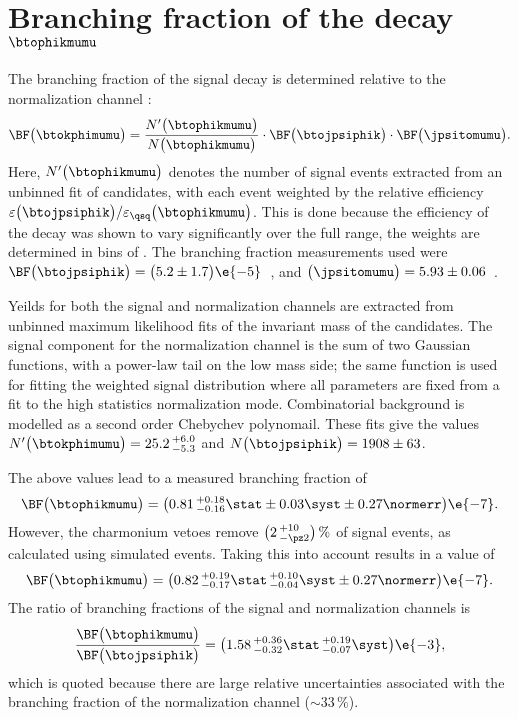 \section[Branching fraction of the decay \btophikmumu]
{Branching fraction of the decay $\boldsymbol{\btophikmumu}$}

The branching fraction of the signal decay \btophikmumu is determined relative to the normalization
channel \btojpsiphik:
\begin{equation}
  \BF\big(\btokphimumu\big)=
  \frac{ N^\prime\big(\btophikmumu\big) }{ N\big(\btophikmumu\big) }
  \cdot\BF\big(\btojpsiphik\big)
  \cdot\BF\big(\jpsitomumu\big).
\end{equation}
Here, $N^\prime\big(\btophikmumu\big)$ denotes the number of signal events extracted from an
unbinned fit of \btophikmumu candidates, with each event weighted by the relative efficiency
$\varepsilon\big(\btojpsiphik\big) / \varepsilon_{\qsq}\big(\btophikmumu\big)$.
This is done because the efficiency of the decay \btophikmumu was shown to vary significantly over
the full \qsq range, the weights are determined in bins of \qsq.
The branching fraction measurements used were
$\BF\big(\btojpsiphik\big)=\big(5.2\pm1.7\big)\e{-5}$~\cite{PDG2012},
and $\big(\jpsitomumu\big)=5.93\pm0.06$~\cite{PDG2012}.

Yeilds for both the signal and normalization channels are extracted from unbinned maximum
likelihood fits of the invariant mass of the \Bp candidates.
The signal component for the normalization channel is the sum of two Gaussian functions, with a
power-law tail on the low mass side; the same function is used for fitting the weighted signal
distribution where all parameters are fixed from a fit to the high statistics normalization mode.
Combinatorial background is modelled as a second order Chebychev polynomail.
These fits give the values
$N^\prime\big(\btokphimumu\big)=25.2\,^{+6.0}_{-5.3}$ and
$N\big(\btojpsiphik\big)=1908\pm63$.

The above values lead to a measured branching fraction of
\begin{equation}
  \BF\big(\btophikmumu\big)=
  \big(0.81\,^{+0.18}_{-0.16}\stat\pm0.03\syst\pm0.27\normerr\big)\e{-7}.
\end{equation}
However, the charmonium vetoes remove $\big(2\,^{+10}_{-\pz2}\big)\,\%$ of signal events, as
calculated using simulated events.
Taking this into account results in a value of
\begin{equation}
  \BF\big(\btophikmumu\big)=
  \big(0.82\,^{+0.19}_{-0.17}\stat\,^{+0.10}_{-0.04}\syst\pm0.27\normerr\big)\e{-7}.
\end{equation}
The ratio of branching fractions of the signal and normalization channels is
\begin{equation}
  \frac{ \BF\big(\btophikmumu\big) }{ \BF\big(\btojpsiphik\big) }
  =\big(1.58\,^{+0.36}_{-0.32}\stat\,^{+0.19}_{-0.07}\syst\big)\e{-3},
\end{equation}
which is quoted because there are large relative uncertainties associated with the branching
fraction of the normalization channel ($\sim33\,\%$).



